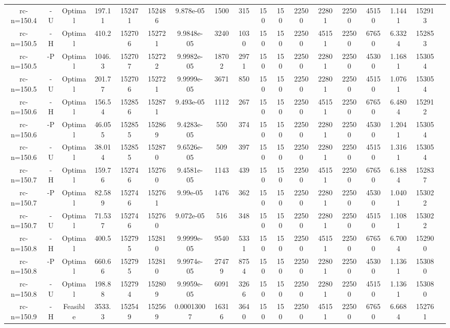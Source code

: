 \documentclass[landscape, a4paper]{article}
\begin{document}
\begin{center}
\begin{tabular}{@{}cccccccccccccccccc@{}}
rc-n=150.4 & -U & Optimal & 197.11 & 152471 & 152486 & 9.878e-05 & 1500 & 315 & 150 & 150 & 22500 & 22801 & 22500 & 45150 & 1.1441 & 152913 & \\
rc-n=150.5 & -H & Optimal & 410.2 & 152706 & 152721 & 9.9848e-05 & 3240 & 1030 & 150 & 150 & 22500 & 45151 & 22500 & 67650 & 6.3324 & 152853 & \\
rc-n=150.5 & -P & Optimal & 1046.3 & 152707 & 152722 & 9.9982e-05 & 18702 & 2971 & 150 & 150 & 22500 & 22801 & 22500 & 45300 & 1.1681 & 153054 & \\
rc-n=150.5 & -U & Optimal & 201.77 & 152706 & 152721 & 9.9999e-05 & 3671 & 850 & 150 & 150 & 22500 & 22801 & 22500 & 45150 & 1.0761 & 153054 & \\
rc-n=150.6 & -H & Optimal & 156.54 & 152856 & 152871 & 9.493e-05 & 1112 & 267 & 150 & 150 & 22500 & 45151 & 22500 & 67650 & 6.4804 & 152912 & \\
rc-n=150.6 & -P & Optimal & 46.055 & 152855 & 152869 & 9.4283e-05 & 550 & 374 & 150 & 150 & 22500 & 22801 & 22500 & 45300 & 1.2041 & 153054 & \\
rc-n=150.6 & -U & Optimal & 38.014 & 152855 & 152870 & 9.6526e-05 & 509 & 397 & 150 & 150 & 22500 & 22801 & 22500 & 45150 & 1.3161 & 153054 & \\
rc-n=150.7 & -H & Optimal & 159.76 & 152746 & 152760 & 9.4581e-05 & 1143 & 439 & 150 & 150 & 22500 & 45151 & 22500 & 67650 & 6.1884 & 152837 & \\
rc-n=150.7 & -P & Optimal & 82.589 & 152746 & 152761 & 9.99e-05 & 1476 & 362 & 150 & 150 & 22500 & 22801 & 22500 & 45300 & 1.0401 & 153022 & \\
rc-n=150.7 & -U & Optimal & 71.537 & 152746 & 152760 & 9.072e-05 & 516 & 348 & 150 & 150 & 22500 & 22801 & 22500 & 45150 & 1.1081 & 153022 & \\
rc-n=150.8 & -H & Optimal & 400.5 & 152795 & 152810 & 9.9999e-05 & 9540 & 5331 & 150 & 150 & 22500 & 45151 & 22500 & 67650 & 6.7004 & 152900 & \\
rc-n=150.8 & -P & Optimal & 660.66 & 152795 & 152810 & 9.9974e-05 & 27479 & 8754 & 150 & 150 & 22500 & 22801 & 22500 & 45300 & 1.1361 & 153080 & \\
rc-n=150.8 & -U & Optimal & 198.88 & 152794 & 152809 & 9.9959e-05 & 6091 & 3266 & 150 & 150 & 22500 & 22801 & 22500 & 45150 & 1.1361 & 153080 & \\
rc-n=150.9 & -H & Feasible & 3533.3 & 152549 & 152569 & 0.00013007 & 16316 & 3640 & 150 & 150 & 22500 & 45151 & 22500 & 67650 & 6.6684 & 152761 & \\

\end{tabular}
\end{center}
\end{document}
